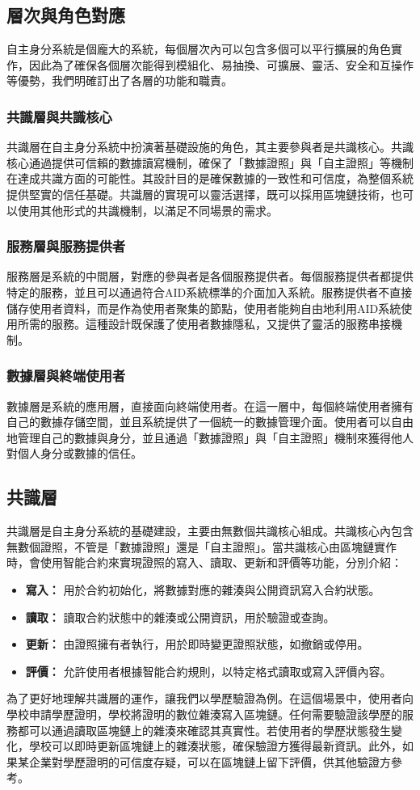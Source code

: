 \subsection{層次與角色對應}
自主身分系統是個龐大的系統，每個層次內可以包含多個可以平行擴展的角色實作，因此為了確保各個層次能得到模組化、易抽換、可擴展、靈活、安全和互操作等優勢，我們明確訂出了各層的功能和職責。
\subsubsection{共識層與共識核心}
共識層在自主身分系統中扮演著基礎設施的角色，其主要參與者是共識核心。共識核心通過提供可信賴的數據讀寫機制，確保了「數據證照」與「自主證照」等機制在達成共識方面的可能性。其設計目的是確保數據的一致性和可信度，為整個系統提供堅實的信任基礎。共識層的實現可以靈活選擇，既可以採用區塊鏈技術，也可以使用其他形式的共識機制，以滿足不同場景的需求。
\subsubsection{服務層與服務提供者}
服務層是系統的中間層，對應的參與者是各個服務提供者。每個服務提供者都提供特定的服務，並且可以通過符合AID系統標準的介面加入系統。服務提供者不直接儲存使用者資料，而是作為使用者聚集的節點，使用者能夠自由地利用AID系統使用所需的服務。這種設計既保護了使用者數據隱私，又提供了靈活的服務串接機制。
\subsubsection{數據層與終端使用者}
數據層是系統的應用層，直接面向終端使用者。在這一層中，每個終端使用者擁有自己的數據存儲空間，並且系統提供了一個統一的數據管理介面。使用者可以自由地管理自己的數據與身分，並且通過「數據證照」與「自主證照」機制來獲得他人對個人身分或數據的信任。
\subsection{共識層}
共識層是自主身分系統的基礎建設，主要由無數個共識核心組成。共識核心內包含無數個證照，不管是「數據證照」還是「自主證照」。當共識核心由區塊鏈實作時，會使用智能合約來實現證照的寫入、讀取、更新和評價等功能，分別介紹：
\begin{itemize}
  \item \textbf{寫入：} 用於合約初始化，將數據對應的雜湊與公開資訊寫入合約狀態。
  \item \textbf{讀取：} 讀取合約狀態中的雜湊或公開資訊，用於驗證或查詢。
  \item \textbf{更新：} 由證照擁有者執行，用於即時變更證照狀態，如撤銷或停用。
  \item \textbf{評價：} 允許使用者根據智能合約規則，以特定格式讀取或寫入評價內容。
\end{itemize}
為了更好地理解共識層的運作，讓我們以學歷驗證為例。在這個場景中，使用者向學校申請學歷證明，學校將證明的數位雜湊寫入區塊鏈。任何需要驗證該學歷的服務都可以通過讀取區塊鏈上的雜湊來確認其真實性。若使用者的學歷狀態發生變化，學校可以即時更新區塊鏈上的雜湊狀態，確保驗證方獲得最新資訊。此外，如果某企業對學歷證明的可信度存疑，可以在區塊鏈上留下評價，供其他驗證方參考。

